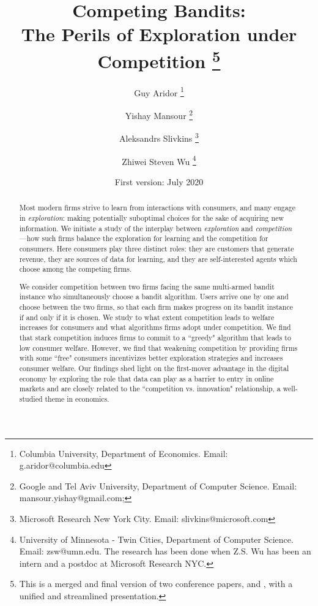 \documentclass[11pt]{article}
\begin{document}

\title{Competing Bandits:\\ 
The Perils of Exploration under Competition%
\thanks{This is a merged and final version of two conference papers,
\citet{CompetingBandits-itcs18} and \citet{CompetingBandits-ec19}, 
with a unified and streamlined presentation.}}

\author{Guy Aridor%
\footnote{Columbia University, Department of Economics. Email: g.aridor@columbia.edu} 
\and
Yishay Mansour%
\footnote{Google and Tel Aviv University, Department of Computer Science. Email: mansour.yishay@gmail.com;} 
\and
Aleksandrs Slivkins%
\footnote{Microsoft Research New York City. Email: slivkins@microsoft.com} 
\and
Zhiwei Steven Wu%
\footnote{University of Minnesota - Twin Cities, Department of Computer Science. Email: zsw@umn.edu.\newline
The research has been done when Z.S. Wu has been an intern and a postdoc at Microsoft Research NYC.
}}
\date{First version: July 2020}
\maketitle
\begin{abstract}
Most modern firms strive to learn from interactions with consumers, and many engage in \emph{exploration}: making potentially suboptimal choices for the sake of acquiring new information. We initiate a study of the interplay between \emph{exploration} and \emph{competition}—how such firms balance the exploration for learning and the competition for consumers. Here consumers play three distinct roles: they are customers that generate revenue, they are sources of data for learning, and they are self-interested agents which choose among the competing firms.

We consider competition between two firms facing the same multi-armed bandit instance who simultaneously choose a bandit algorithm. Users arrive one by one and choose between the two firms, so that each firm makes progress on its bandit instance if and only if it is chosen. We study to what extent competition leads to welfare increases for consumers and what algorithms firms adopt under competition. We find that stark competition induces firms to commit to a ``greedy" algorithm that leads to low consumer welfare. However, we find that weakening competition by providing firms with some ``free" consumers incentivizes better exploration strategies and increases consumer welfare. Our findings shed light on the first-mover advantage in the digital economy by exploring the role that data can play as a barrier to entry in online markets and are closely related to the ``competition vs. innovation" relationship, a well-studied theme in economics.

\vspace{0.2in}

\bigskip
\end{abstract}
\end{document}
